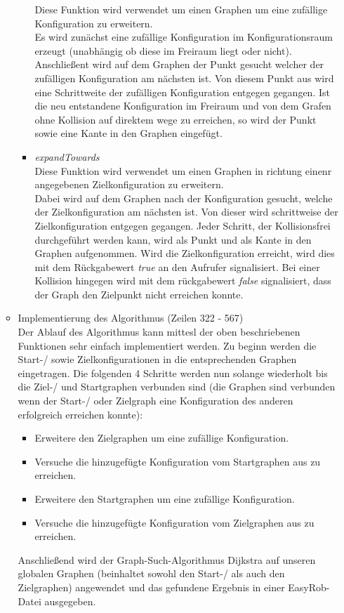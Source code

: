 \documentclass[a4paper]{scrartcl}
\begin{document}
\begin{itemize}
\begin{itemize}
\begin{itemize}
				Diese Funktion wird verwendet um einen Graphen um eine zufällige Konfiguration zu erweitern.\\
				Es wird zunächst eine zufällige Konfiguration im Konfigurationsraum erzeugt (unabhängig ob diese im Freiraum liegt oder nicht). Anschließent wird auf dem Graphen der Punkt gesucht welcher der zufälligen Konfiguration am nächsten ist. Von diesem Punkt aus wird eine Schrittweite der zufälligen Konfiguration entgegen gegangen. Ist die neu entstandene Konfiguration im Freiraum und von dem Grafen ohne Kollision auf direktem wege zu erreichen, so wird der Punkt sowie eine Kante in den Graphen eingefügt.
			\item \textit{expandTowards} \\
				Diese Funktion wird verwendet um einen Graphen in richtung einenr angegebenen Zielkonfiguration zu erweitern.\\
				Dabei wird auf dem Graphen nach der Konfiguration gesucht, welche der Zielkonfiguration am nächsten ist. Von dieser wird schrittweise der Zielkonfiguration entgegen gegangen. Jeder Schritt, der Kollisionsfrei durchgeführt werden kann, wird als Punkt und als Kante in den Graphen aufgenommen. Wird die Zielkonfiguration erreicht, wird dies mit dem Rückgabewert \textit{true} an den Aufrufer signalisiert. Bei einer Kollision hingegen wird mit dem rückgabewert \textit{false} signalisiert, dass der Graph den Zielpunkt nicht erreichen konnte.
		\end{itemize}
		\item Implementierung des Algorithmus (Zeilen 322 - 567)\\
			Der Ablauf des Algorithmus kann mittesl der oben beschriebenen Funktionen sehr einfach implementiert werden. Zu beginn werden die Start-/ sowie Zielkonfigurationen in die entsprechenden Graphen eingetragen. Die folgenden 4 Schritte werden nun solange wiederholt bis die Ziel-/ und Startgraphen verbunden sind (die Graphen sind verbunden wenn der Start-/ oder Zielgraph eine Konfiguration des anderen erfolgreich erreichen konnte):
			\begin{itemize}
				\item Erweitere den Zielgraphen um eine zufällige Konfiguration.
				\item Versuche die hinzugefügte Konfiguration vom Startgraphen aus zu erreichen.
				\item Erweitere den Startgraphen um eine zufällige Konfiguration.
				\item Versuche die hinzugefügte Konfiguration vom Zielgraphen aus zu erreichen.
			\end{itemize}
			Anschließend wird der Graph-Such-Algorithmus Dijkstra auf unseren globalen Graphen (beinhaltet sowohl den Start-/ als auch den Zielgraphen) angewendet und das gefundene Ergebnis in einer EasyRob-Datei ausgegeben.
	\end{itemize}
\end{itemize}
\end{document}
